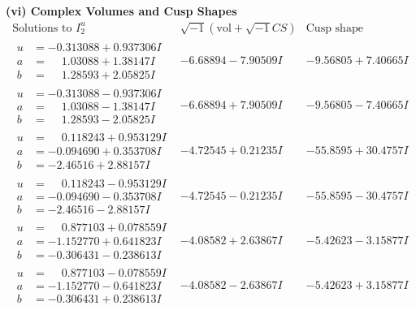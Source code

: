 \documentclass[1p]{elsarticle_modified}
\theoremstyle{definition}
\newcommand{\I}{\sqrt{-1}}
\begin{document}
\newpage\flushleft \textbf{(vi) Complex Volumes and Cusp Shapes}
$$\begin{array}{c|c|c}  
\text{Solutions to }I^u_{2}& \I (\text{vol} + \sqrt{-1}CS) & \text{Cusp shape}\\
 \hline 
\begin{aligned}
u &= -0.313088 + 0.937306 I \\
a &= \phantom{-}1.03088 + 1.38147 I \\
b &= \phantom{-}1.28593 + 2.05825 I\end{aligned}
 & -6.68894 - 7.90509 I & -9.56805 + 7.40665 I \\ \hline\begin{aligned}
u &= -0.313088 - 0.937306 I \\
a &= \phantom{-}1.03088 - 1.38147 I \\
b &= \phantom{-}1.28593 - 2.05825 I\end{aligned}
 & -6.68894 + 7.90509 I & -9.56805 - 7.40665 I \\ \hline\begin{aligned}
u &= \phantom{-}0.118243 + 0.953129 I \\
a &= -0.094690 + 0.353708 I \\
b &= -2.46516 + 2.88157 I\end{aligned}
 & -4.72545 + 0.21235 I & -55.8595 + 30.4757 I \\ \hline\begin{aligned}
u &= \phantom{-}0.118243 - 0.953129 I \\
a &= -0.094690 - 0.353708 I \\
b &= -2.46516 - 2.88157 I\end{aligned}
 & -4.72545 - 0.21235 I & -55.8595 - 30.4757 I \\ \hline\begin{aligned}
u &= \phantom{-}0.877103 + 0.078559 I \\
a &= -1.152770 + 0.641823 I \\
b &= -0.306431 - 0.238613 I\end{aligned}
 & -4.08582 + 2.63867 I & -5.42623 - 3.15877 I \\ \hline\begin{aligned}
u &= \phantom{-}0.877103 - 0.078559 I \\
a &= -1.152770 - 0.641823 I \\
b &= -0.306431 + 0.238613 I\end{aligned}
 & -4.08582 - 2.63867 I & -5.42623 + 3.15877 I \\ \hline\begin{aligned}

\end{aligned}
\end{array}$$
\end{document}
